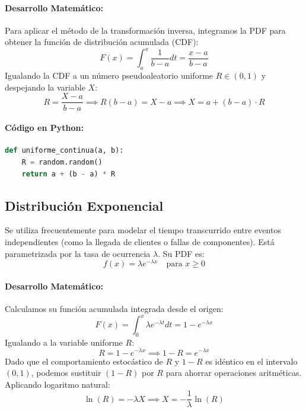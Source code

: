\documentclass{article}
\begin{document}
\paragraph{Desarrollo Matemático:}
Para aplicar el método de la transformación inversa, integramos la PDF para obtener la función de distribución acumulada (CDF):
\begin{equation}
F(x) = \int_{a}^{x} \frac{1}{b-a} dt = \frac{x-a}{b-a}
\end{equation}
Igualando la CDF a un número pseudoaleatorio uniforme $R \in (0,1)$ y despejando la variable $X$:
\begin{equation}
R = \frac{X-a}{b-a} \implies R(b-a) = X-a \implies X = a + (b-a) \cdot R
\end{equation}

\paragraph{Código en Python:}
\begin{lstlisting}[language=Python, caption=Generador para Distribución Uniforme Continua.]
def uniforme_continua(a, b):
    R = random.random()
    return a + (b - a) * R
\end{lstlisting}

\subsection{Distribución Exponencial}
Se utiliza frecuentemente para modelar el tiempo transcurrido entre eventos independientes (como la llegada de clientes o fallas de componentes). Está parametrizada por la tasa de ocurrencia $\lambda$. Su PDF es:
\begin{equation}
f(x) = \lambda e^{-\lambda x} \quad \text{para } x \ge 0
\end{equation}

\paragraph{Desarrollo Matemático:}
Calculamos su función acumulada integrada desde el origen:
\begin{equation}
F(x) = \int_{0}^{x} \lambda e^{-\lambda t} dt = 1 - e^{-\lambda x}
\end{equation}
Igualando a la variable uniforme $R$:
\begin{equation}
R = 1 - e^{-\lambda x} \implies 1 - R = e^{-\lambda x}
\end{equation}
Dado que el comportamiento estocástico de $R$ y $1-R$ es idéntico en el intervalo $(0,1)$, podemos sustituir $(1-R)$ por $R$ para ahorrar operaciones aritméticas. Aplicando logaritmo natural:
\begin{equation}
\ln(R) = -\lambda X \implies X = -\frac{1}{\lambda} \ln(R)
\end{equation}
\end{document}
